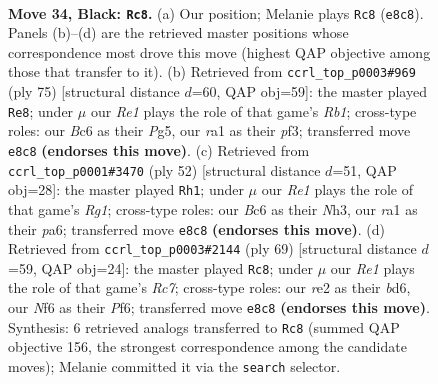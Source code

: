 \documentclass[11pt]{article}
\begin{document}
\clearpage

\begin{figure}[p]\centering
\begin{subfigure}{0.46\textwidth}\centering
\resizebox{\linewidth}{!}{%
\newchessgame
\chessboard[
  setfen={4r3/p1b3pk/P1b2n1p/1p3p2/5P2/1P2P1P1/4R3/RNB3K1 b - - 3 34},
  showmover=false,
  pgfstyle=straightmove, color=movearrow, markmove={e8-c8}
]}
\caption{}
\end{subfigure}\hfill
\begin{subfigure}{0.46\textwidth}\centering
\resizebox{\linewidth}{!}{%
\newchessgame
\chessboard[
  setfen={1r4k1/5pp1/2p5/p1Pp2pn/3B4/PP3PbP/2B3P1/1R3K2 b - - 4 38},
  showmover=false,
  pgfstyle=straightmove, color=movearrow, markmove={b8-e8}
]}
\caption{}
\end{subfigure}
\\[4pt]
\begin{subfigure}{0.46\textwidth}\centering
\resizebox{\linewidth}{!}{%
\newchessgame
\chessboard[
  setfen={2r5/1p4pk/p2bp1np/P1p5/4P3/2PPB2N/1P2K3/6R1 w - - 2 27},
  showmover=false,
  pgfstyle=straightmove, color=movearrow, markmove={g1-h1}
]}
\caption{}
\end{subfigure}\hfill
\begin{subfigure}{0.46\textwidth}\centering
\resizebox{\linewidth}{!}{%
\newchessgame
\chessboard[
  setfen={8/p5p1/3B1p2/1P3k1p/P3pP1P/3bP3/2r3PK/R7 b - - 1 35},
  showmover=false,
  pgfstyle=straightmove, color=movearrow, markmove={c2-c8}
]}
\caption{}
\end{subfigure}
\caption{\textbf{Move 34, Black: \texttt{Rc8}.} (a) Our position; Melanie plays \texttt{Rc8} (\texttt{e8c8}). Panels (b)--(d) are the retrieved master positions whose correspondence most drove this move (highest QAP objective among those that transfer to it). (b) Retrieved from \texttt{ccrl\_top\_p0003\#969} (ply 75) [structural distance $d$=60, QAP obj=59]: the master played \texttt{Re8}; under $\mu$ our \emph{Re1} plays the role of that game's \emph{Rb1}; cross-type roles: our \emph{B}c6 as their \emph{P}g5, our \emph{r}a1 as their \emph{p}f3; transferred move \texttt{e8c8} \textbf{(endorses this move)}. (c) Retrieved from \texttt{ccrl\_top\_p0001\#3470} (ply 52) [structural distance $d$=51, QAP obj=28]: the master played \texttt{Rh1}; under $\mu$ our \emph{Re1} plays the role of that game's \emph{Rg1}; cross-type roles: our \emph{B}c6 as their \emph{N}h3, our \emph{r}a1 as their \emph{p}a6; transferred move \texttt{e8c8} \textbf{(endorses this move)}. (d) Retrieved from \texttt{ccrl\_top\_p0003\#2144} (ply 69) [structural distance $d$=59, QAP obj=24]: the master played \texttt{Rc8}; under $\mu$ our \emph{Re1} plays the role of that game's \emph{Rc7}; cross-type roles: our \emph{r}e2 as their \emph{b}d6, our \emph{N}f6 as their \emph{P}f6; transferred move \texttt{e8c8} \textbf{(endorses this move)}. Synthesis: 6 retrieved analogs transferred to \texttt{Rc8} (summed QAP objective 156, the strongest correspondence among the candidate moves); Melanie committed it via the \texttt{search} selector.}
\label{fig:thought-m67}
\end{figure}
\end{document}

